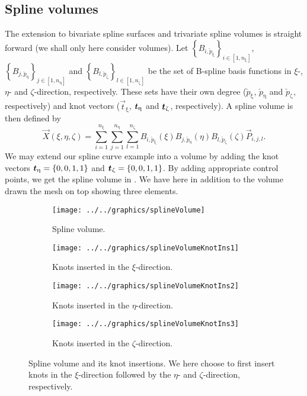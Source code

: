 \subsection{Spline volumes}
\label{Sec:splineVolumes}
\renewcommand{\Xi}{{\vec{t}_\upxi}}
The extension to bivariate spline surfaces and trivariate spline volumes is straight forward (we shall only here consider volumes). Let $\left\{B_{i,\check{p}_\upxi}\right\}_{i\in[1,n_\upxi]}$, $\left\{B_{j,\check{p}_\upeta}\right\}_{j\in[1,n_\upeta]}$ and $\left\{B_{l,\check{p}_\upzeta}\right\}_{l\in[1,n_\upzeta]}$ be the set of B-spline basis functions in $\xi$-, $\eta$- and $\zeta$-direction, respectively. These sets have their own degree ($\check{p}_\upxi$, $\check{p}_\upeta$ and $\check{p}_\upzeta$, respectively) and knot vectors ($\Xi$, $\Eta$ and $\Zeta$, respectively). A spline volume is then defined by
\begin{equation*}
	\vec{X}(\xi,\eta,\zeta) = \sum_{i=1}^{n_\upxi}\sum_{j=1}^{n_\upeta}\sum_{l=1}^{n_\upzeta} B_{i,\check{p}_\upxi}(\xi)B_{j,\check{p}_\upeta}(\eta)B_{l,\check{p}_\upzeta}(\zeta)\vec{P}_{i,j,l}.
\end{equation*}
We may extend our spline curve example into a volume by adding the knot vectors $\Eta = \{0, 0, 1, 1\}$ and $\Zeta = \{0, 0, 1, 1\}$. By adding appropriate control points, we get the spline volume in . We have here in addition to the volume drawn the mesh on top showing three elements. 
\begin{figure}
	\centering        
	\begin{subfigure}{0.49\textwidth}
		\centering     
		\texttt{[image: ../../graphics/splineVolume]}
		\caption{Spline volume.}
	\end{subfigure}%
    \hspace*{0.02\textwidth}%
	\begin{subfigure}{0.49\textwidth}
		\centering     
		\texttt{[image: ../../graphics/splineVolumeKnotIns1]}
		\caption{Knots inserted in the $\xi$-direction.}
	\end{subfigure}
	\bigskip\par
	\bigskip\par
	\begin{subfigure}{0.49\textwidth}
		\centering     
		\texttt{[image: ../../graphics/splineVolumeKnotIns2]}
		\caption{Knots inserted in the $\eta$-direction.}
	\end{subfigure}%
    \hspace*{0.02\textwidth}%
	\begin{subfigure}{0.49\textwidth}
		\centering     
		\texttt{[image: ../../graphics/splineVolumeKnotIns3]}
		\caption{Knots inserted in the $\zeta$-direction.}
	\end{subfigure}
	\caption[Spline volume and its knot insertions]{Spline volume and its knot insertions. We here choose to first insert knots in the $\xi$-direction followed by the $\eta$- and $\zeta$-direction, respectively.}
	\label{Fig:SplineVolume}
\end{figure}

